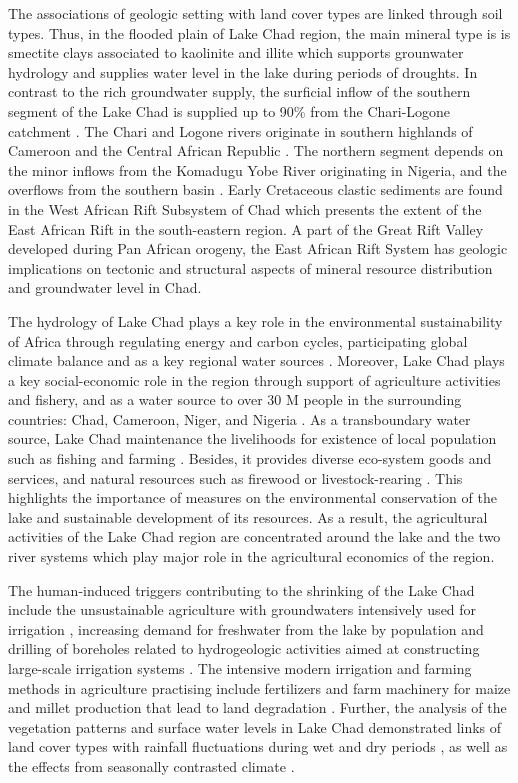 \documentclass[geosciences,article,submit,pdftex,moreauthors]{Definitions/mdpi}
\begin{document}
The associations of geologic setting with land cover types are linked through soil types. Thus, in the flooded plain of Lake Chad region, the main mineral type is is smectite clays associated to kaolinite and illite \cite{JEANPIERRE2019176} which supports grounwater hydrology and supplies water level in the lake during periods of droughts. In contrast to the rich groundwater supply, the surficial inflow of the southern segment of the Lake Chad is supplied up to 90\% from the Chari-Logone catchment \cite{earth2020020}. The Chari and Logone rivers originate in southern highlands of Cameroon and the Central African Republic \cite{Hutchinson}. The northern segment depends on the minor inflows from the Komadugu Yobe River originating in Nigeria, and the overflows from the southern basin \cite{Fougou}. Early Cretaceous clastic sediments are found in the West African Rift Subsystem of Chad \cite{GENIK1992169} which presents the extent of the East African Rift in the south-eastern region. A part of the Great Rift Valley developed during Pan African orogeny, the East African Rift System has geologic implications on tectonic and structural aspects of mineral resource distribution and groundwater level in Chad. 

The hydrology of Lake Chad plays a key role in the environmental sustainability of Africa through regulating energy and carbon cycles, participating global climate balance and as a key regional water sources \cite{Papa,Tranvik}. Moreover, Lake Chad plays a key social-economic role in the region through support of agriculture activities and fishery, and as a water source to over 30 M people in the surrounding countries: Chad, Cameroon, Niger, and Nigeria \cite{VAQUERO2021100935}. As a transboundary water source, Lake Chad maintenance the livelihoods for existence of local population such as fishing and farming  \cite{Sarch,resources6030041,Baroin}. Besides, it provides diverse eco-system goods and services, and natural resources such as firewood or livestock-rearing \cite{RIEBE2021104486}. This highlights the importance of measures on the environmental conservation of the lake and sustainable development of its resources. As a result, the agricultural activities of the Lake Chad region are concentrated around the lake and the two river systems which play major role in the agricultural economics of the region. 

The human-induced triggers contributing to the shrinking of the Lake Chad include the unsustainable agriculture with groundwaters intensively used for irrigation \cite{Lemoalle}, increasing demand for freshwater from the lake by population \cite{Baroin} and drilling of boreholes related to hydrogeologic activities aimed at constructing large-scale irrigation systems \cite{BIRKETT2000218}. The intensive modern irrigation and farming methods in agriculture practising include fertilizers and farm machinery for maize and millet production that lead to land degradation \cite{NILSSON201615}. Further, the analysis of the vegetation patterns and surface water levels in Lake Chad demonstrated links of land cover types with rainfall fluctuations during wet and dry periods \cite{balme2006annees}, as well as the effects from seasonally contrasted climate \cite{GBETKOM2023159302}.
\end{document}

